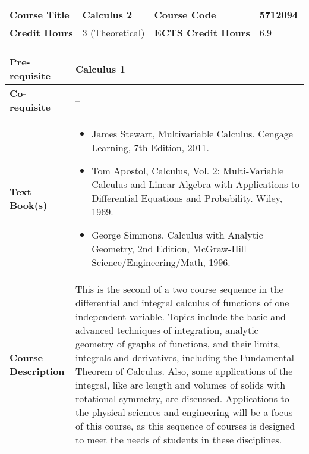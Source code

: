 \documentclass[12pt]{article}
\begin{document}
 \begin{minipage}{\textwidth}
\begin{tabularx}{\textwidth}{|l|X|l|X|}
\hline
\textbf{Course Title}       &   Calculus 2 & \textbf{Course Code}       &   5712094 \\ \hline
\textbf{Credit Hours}       &  3 (Theoretical) & \textbf{ECTS Credit Hours}       &  6.9 \\ \hline
\end{tabularx}

\begin{tabularx}{\textwidth}{|l|X|}
\hline
\textbf{Pre-requisite}      &  Calculus 1 \\ \hline
\textbf{Co-requisite}       &  -- \\ \hline
\textbf{Text Book(s)}      & \begin{minipage}{.70\textwidth}
					\begin{itemize} \itemsep-0.4em
						\vspace{3mm}
						\item James Stewart, Multivariable Calculus. Cengage Learning, 7th Edition, 2011.
						\item Tom Apostol, Calculus, Vol. 2: Multi-Variable Calculus and Linear Algebra with Applications to Differential Equations and Probability. Wiley, 1969.
						\item George Simmons, Calculus with Analytic Geometry, 2nd Edition, McGraw-Hill Science/Engineering/Math, 1996.
						\vspace{3mm}
					\end{itemize}
				\end{minipage}  \\ \hline
\textbf{Course Description} & \begin{minipage}{.70\textwidth}
					\vspace{3mm}
					
					This is the second of a two course sequence in the differential and integral calculus of functions of one independent variable. Topics include the basic and advanced techniques of integration, analytic geometry of graphs of functions, and their limits, integrals and derivatives, including the Fundamental Theorem of Calculus. Also, some applications of the integral, like arc length and volumes of solids with rotational symmetry, are discussed. Applications to the physical sciences and engineering will be a focus of this course, as this sequence of courses is designed to meet the needs of students in these disciplines.
					\newline
					

\end{minipage}
\end{tabularx}
\end{minipage}
\end{document}
